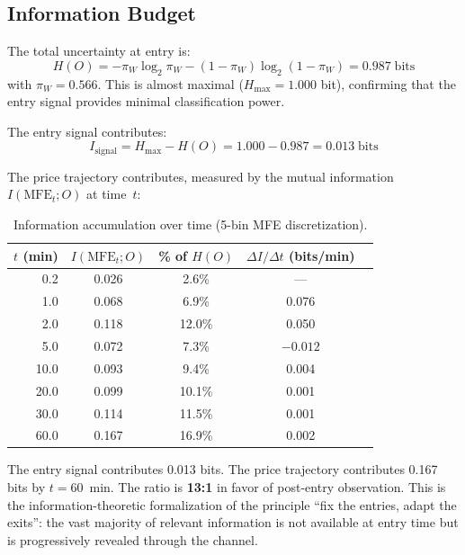 \documentclass[11pt,a4paper]{article}
\begin{document}
\subsection{Information Budget}

The total uncertainty at entry is:
\begin{equation}
H(O) = -\pi_W \log_2 \pi_W - (1-\pi_W) \log_2(1-\pi_W) = 0.987 \;\text{bits}
\end{equation}
with $\pi_W = 0.566$. This is almost maximal ($H_{\max} = 1.000$ bit), confirming that the entry signal provides minimal classification power.

The entry signal contributes:
\begin{equation}
I_{\text{signal}} = H_{\max} - H(O) = 1.000 - 0.987 = 0.013 \;\text{bits}
\end{equation}

The price trajectory contributes, measured by the mutual information $I(\text{MFE}_t; O)$ at time~$t$:

\begin{table}[H]
\centering
\caption{Information accumulation over time (5-bin MFE discretization).}
\begin{tabular}{rcccc}
\toprule
$t$ (min) & $I(\text{MFE}_t; O)$ & \% of $H(O)$ & $\Delta I / \Delta t$ (bits/min) \\
\midrule
0.2 & 0.026 & 2.6\% & --- \\
1.0 & 0.068 & 6.9\% & 0.076 \\
2.0 & 0.118 & 12.0\% & 0.050 \\
5.0 & 0.072 & 7.3\% & $-0.012$ \\
10.0 & 0.093 & 9.4\% & 0.004 \\
20.0 & 0.099 & 10.1\% & 0.001 \\
30.0 & 0.114 & 11.5\% & 0.001 \\
60.0 & 0.167 & 16.9\% & 0.002 \\
\bottomrule
\end{tabular}
\end{table}

\begin{tcolorbox}[keybox, title=Signal vs.\ Trajectory: 13:1 Information Ratio]
The entry signal contributes 0.013 bits. The price trajectory contributes 0.167 bits by $t = 60$~min. The ratio is \textbf{13:1} in favor of post-entry observation. This is the information-theoretic formalization of the principle ``fix the entries, adapt the exits'': the vast majority of relevant information is not available at entry time but is progressively revealed through the channel.
\end{tcolorbox}
\end{document}
